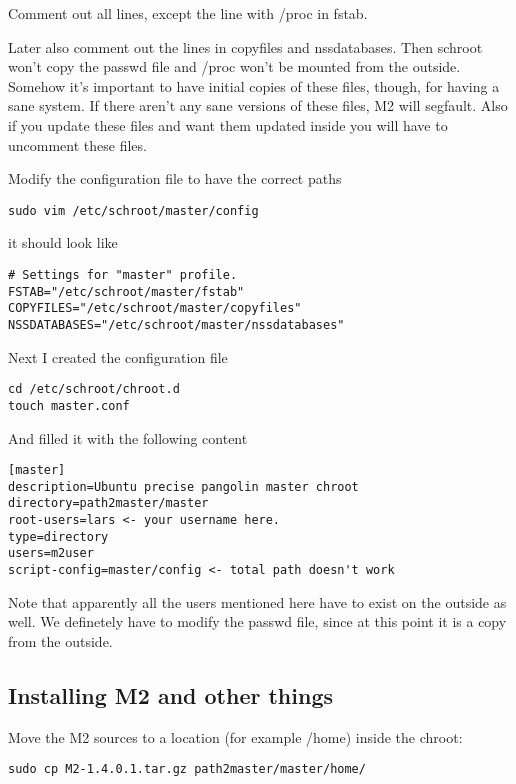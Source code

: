\documentclass[a4paper]{book}
\begin{document}
Comment out all lines, except the line with /proc in fstab. 

Later also comment out the lines in copyfiles and nssdatabases.  Then schroot
won't copy the passwd file and /proc won't be mounted from the outside.
Somehow it's important to have initial copies of these files, though, for
having a sane system. If there aren't any sane versions of these files, M2 will
segfault.  Also if you update these files and want them updated inside you will
have to uncomment these files.

Modify the configuration file to have the correct paths

\begin{verbatim}
sudo vim /etc/schroot/master/config
\end{verbatim}

it should look like

\begin{verbatim}
# Settings for "master" profile.
FSTAB="/etc/schroot/master/fstab"
COPYFILES="/etc/schroot/master/copyfiles"
NSSDATABASES="/etc/schroot/master/nssdatabases"
\end{verbatim}

Next I created the configuration file

\begin{verbatim}
cd /etc/schroot/chroot.d
touch master.conf
\end{verbatim}

And filled it with the following content

\begin{verbatim}
[master]
description=Ubuntu precise pangolin master chroot
directory=path2master/master
root-users=lars <- your username here.
type=directory
users=m2user
script-config=master/config <- total path doesn't work
\end{verbatim}

Note that apparently all the users mentioned here have to exist on the outside
as well.  We definetely have to modify the passwd file, since at this point it
is a copy from the outside.

\subsection{Installing M2 and other things}

Move the M2 sources to a location (for example /home) inside the chroot:

\begin{verbatim}
sudo cp M2-1.4.0.1.tar.gz path2master/master/home/
\end{verbatim}
\end{document}
